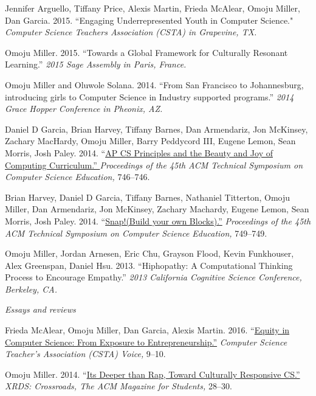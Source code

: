 \documentclass[11pt,article,oneside]{memoir}
\begin{document}
\ind Jennifer Arguello, Tiffany Price, Alexis Martin, Frieda McAlear, Omoju Miller, Dan Garcia. 2015. ``Engaging Underrepresented Youth in Computer Science."  \emph{Computer Science Teachers Association (CSTA) in Grapevine, TX.}

\ind Omoju Miller. 2015. ``Towards a Global Framework for Culturally Resonant Learning.'' \emph{2015 Sage Assembly in Paris, France.} 

\ind Omoju Miller and Oluwole Solana. 2014. ``From San Francisco to Johannesburg, introducing girls to Computer Science in Industry supported programs.'' \emph{2014 Grace Hopper Conference in Pheonix, AZ.}

\ind Daniel D Garcia, Brian Harvey, Tiffany Barnes, Dan Armendariz, Jon McKinsey, Zachary MacHardy, Omoju Miller, Barry Peddycord III, Eugene Lemon, Sean Morris, Josh Paley. 2014. ``\href{http://dl.acm.org/citation.cfm?id=2539026}{AP CS Principles and the Beauty and Joy of Computing Curriculum.'' }\emph{Proceedings of the 45th ACM Technical Symposium on Computer Science Education,} 746--746. 

\ind Brian Harvey, Daniel D Garcia, Tiffany Barnes, Nathaniel Titterton, Omoju Miller, Dan Armendariz, Jon McKinsey, Zachary Machardy, Eugene Lemon, Sean Morris, Josh Paley. 2014. ``\href{http://dl.acm.org/citation.cfm?id=2539022}{Snap!(Build your own Blocks).''} \emph{Proceedings of the 45th ACM Technical Symposium on Computer Science Education,} 749--749. 

\ind Omoju Miller, Jordan Arnesen, Eric Chu, Grayson Flood, Kevin Funkhouser, Alex Greenspan, Daniel Hsu. 2013. ``Hiphopathy: A Computational Thinking Process to Encourage Empathy.'' \emph{2013 California Cognitive Science Conference, Berkeley, CA.} 
 
\bigskip
\noindent\emph{Essays and reviews \vspace{0.05in}}



\ind Frieda McAlear, Omoju Miller, Dan Garcia, Alexis Martin. 2016. ``\href{http://www.csta.acm.org/Communications/sub/CSTAVoice_Files/csta_voice_01_2016.pdf}{Equity in Computer Science: From Exposure to Entrepreneurship.''} \emph{Computer Science Teacher's Association (CSTA) Voice, } 9--10. 

\ind Omoju Miller. 2014. ``\href{http://dl.acm.org/citation.cfm?id=2604994}{Its Deeper than Rap, Toward Culturally Responsive CS.'' }\emph{XRDS: Crossroads,  The ACM Magazine for Students, } 28--30. 
\end{document}
